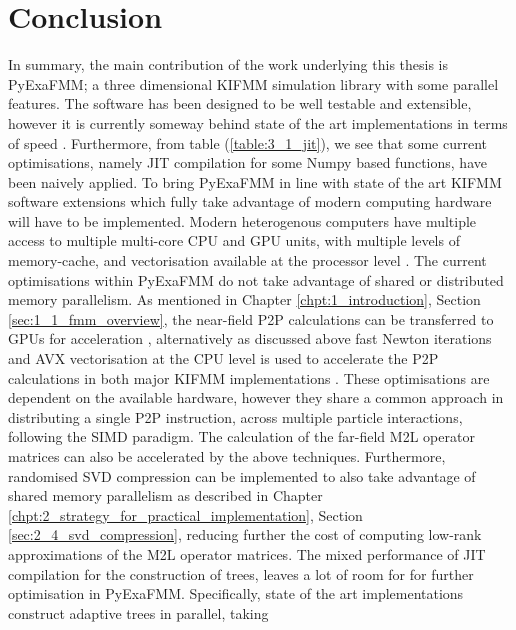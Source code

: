 \chapter{Conclusion}\label{chpt:conclusion}

In summary, the main contribution of the work underlying this thesis is
\gls{PyExaFMM}; a three dimensional \gls{KIFMM} simulation library
with some parallel features. The software has been designed to be well
testable and extensible, however it is currently someway behind state of the art
implementations in terms of speed \cite{Malhotra:2015:CCP, exafmm}.
Furthermore, from table (\ref{table:3_1_jit}),
we see that some current optimisations, namely \gls{JIT} compilation for some
Numpy based functions, have been naively applied. To bring
 \gls{PyExaFMM} in line with state of the art \gls{KIFMM} software
extensions which fully take advantage of modern computing hardware will
have to be implemented. Modern heterogenous computers have multiple access to
multiple multi-core \gls{CPU} and \gls{GPU} units, with multiple levels of
memory-cache, and vectorisation available at the processor level
\cite{Malhotra:2015:CCP}. The current optimisations within \gls{PyExaFMM} do not
take advantage of shared or distributed memory parallelism. As mentioned in
Chapter \ref{chpt:1_introduction}, Section \ref{sec:1_1_fmm_overview}, the near-field
\gls{P2P} calculations can be transferred to \gls{GPU}s for acceleration
\cite{Hwu:2011:MKP}, alternatively as discussed above fast Newton iterations and
\gls{AVX} vectorisation at the \gls{CPU} level
is used to accelerate the \gls{P2P} calculations in both major \gls{KIFMM}
implementations \cite{Malhotra:2015:CCP, exafmm}. These optimisations are
dependent on the available hardware, however they share a common approach in distributing
a single \gls{P2P} instruction, across multiple particle interactions, following
the \gls{SIMD} paradigm. The calculation of the far-field \gls{M2L} operator
matrices can also be accelerated by the above techniques. Furthermore, randomised
\gls{SVD} compression \cite{Erichson:2019:JOSS, Halko:2011:SIAM} can be implemented
to also take advantage of shared memory parallelism as described in Chapter
\ref{chpt:2_strategy_for_practical_implementation}, Section \ref{sec:2_4_svd_compression},
reducing further the cost of computing low-rank approximations of the \gls{M2L} operator matrices.
The mixed performance of \gls{JIT} compilation for the construction of trees,
leaves a lot of room for for further optimisation in \gls{PyExaFMM}. Specifically,
state of the art implementations construct adaptive trees in parallel, taking

